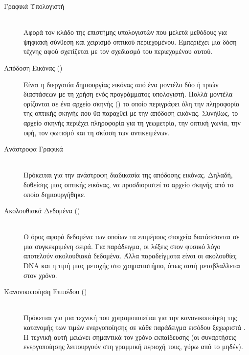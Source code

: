 \begin{description}
    \item[Γραφικά Υπολογιστή] \hfill \\ Αφορά τον κλάδο της επιστήμης υπολογιστών που μελετά μεθόδους για ψηφιακή σύνθεση και χειρισμό οπτικού περιεχομένου. Εμπεριέχει μια δόση τέχνης αφού σχετίζεται με τον σχεδιασμό του περιεχομένου αυτού.
    
    \item[Απόδοση Εικόνας ()] Είναι η διεργασία δημιουργίας εικόνας από ένα μοντέλο δύο ή τριών διαστάσεων με τη χρήση ενός προγράμματος υπολογιστή. Πολλά μοντέλα ορίζονται σε ένα αρχείο σκηνής () το οποίο περιγράφει όλη την πληροφορία της οπτικής σκηνής που θα παραχθεί με την απόδοση εικόνας. Συνήθως, το αρχείο σκηνής περιέχει πληροφορία για τη γεωμετρία, την οπτική γωνία, την υφή, τον φωτισμό και τη σκίαση των αντικειμένων.
    
    \item[Ανάστροφα Γραφικά] \hfill \\ Πρόκειται για την ανάστροφη διαδικασία της απόδοσης εικόνας. Δηλαδή, δοθείσης μιας οπτικής εικόνας, να προσδιοριστεί το αρχείο σκηνής από το οποίο δημιουργήθηκε.
    
    \item[Ακολουθιακά Δεδομένα ()] \hfill \\ Ο όρος αφορά δεδομένα των οποίων τα επιμέρους στοιχεία διατάσσονται σε μια συγκεκριμένη σειρά. Για παράδειγμα, οι λέξεις στον φυσικό λόγο αποτελούν ακολουθιακά δεδομένα. Άλλα παραδείγματα είναι οι ακολουθίες DNA και η τιμή μιας μετοχής στο χρηματιστήριο, όπως αυτή μεταβλαλλεται στον χρόνο.
    \item[Κανονικοποίηση Επιπέδου ()] \hfill \\ Πρόκειται για μια τεχνική που χρησιμοποιείται για την κανονικοποίηση της κατανομής των τιμών ενεργοποίησης σε κάθε παράδειγμα εισόδου ξεχωριστά \cite{ba2016layer_normalization}. Η τεχνική αυτή μειώνει σημαντικά τον χρόνο εκπαίδευσης (οι συναρτήσεις ενεργοποίησης λειτουργούν στη γραμμική περιοχή τους, γύρω από το μηδέν). 
 \end{description}